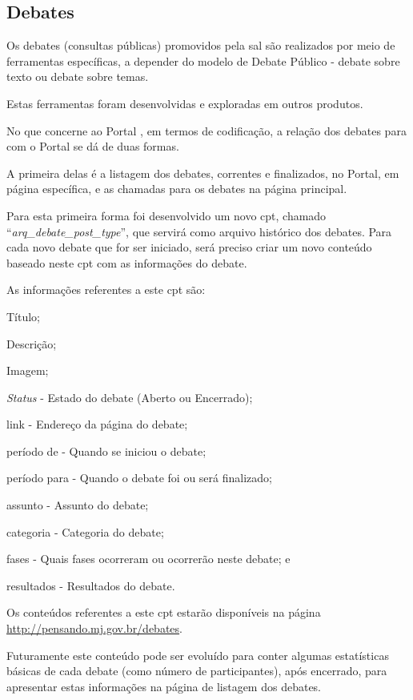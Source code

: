 \subsection{Debates}
Os debates (consultas públicas) promovidos pela \gls{sal} são realizados por meio de ferramentas específicas, a depender do modelo de Debate Público - debate sobre texto ou debate sobre temas.

Estas ferramentas foram desenvolvidas e exploradas em outros produtos.

No que concerne ao Portal \ppod, em termos de codificação, a relação dos debates para com o Portal se dá de duas formas.

A primeira delas é a listagem dos debates, correntes e finalizados, no Portal, em página específica, e as chamadas para os debates na página principal.

Para esta primeira forma foi desenvolvido um novo \gls{cpt}, chamado ``\textit{arq\_debate\_post\_type}'', que servirá como arquivo histórico dos debates. Para cada novo debate que for ser iniciado, será preciso criar um novo conteúdo baseado neste \gls{cpt} com as informações do debate.

As informações referentes a este \gls{cpt} são:
\begin{description}
\item Título;
\item Descrição;
\item Imagem;
\item \textit{Status} - Estado do debate (Aberto ou Encerrado);
\item link - Endereço da página do debate;
\item período de - Quando se iniciou o debate;
\item período para - Quando o debate foi ou será finalizado;
\item assunto - Assunto do debate;
\item categoria - Categoria do debate;
\item fases - Quais fases ocorreram ou ocorrerão neste debate; e
\item resultados - Resultados do debate.
\end{description}

Os conteúdos referentes a este \gls{cpt} estarão disponíveis na página \url{http://pensando.mj.gov.br/debates}.

Futuramente este conteúdo pode ser evoluído para conter algumas estatísticas básicas de cada debate (como número de participantes), após encerrado, para apresentar estas informações na página de listagem dos debates.

